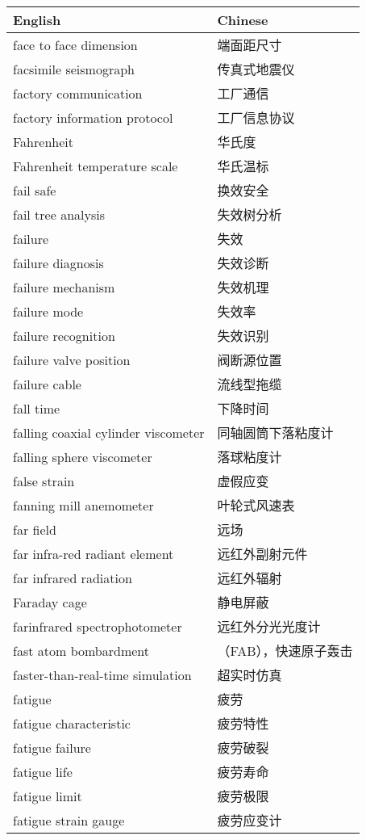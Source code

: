 \documentclass[
]{article}
\begin{document}
\begin{longtable}[]{@{}ll@{}}
\toprule()
English & Chinese \\
\midrule()
\endhead
face to face dimension & 端面距尺寸 \\
facsimile seismograph & 传真式地震仪 \\
factory communication & 工厂通信 \\
factory information protocol & 工厂信息协议 \\
Fahrenheit & 华氏度 \\
Fahrenheit temperature scale & 华氏温标 \\
fail safe & 换效安全 \\
fail tree analysis & 失效树分析 \\
failure & 失效 \\
failure diagnosis & 失效诊断 \\
failure mechanism & 失效机理 \\
failure mode & 失效率 \\
failure recognition & 失效识别 \\
failure valve position & 阀断源位置 \\
failure cable & 流线型拖缆 \\
fall time & 下降时间 \\
falling coaxial cylinder viscometer & 同轴圆筒下落粘度计 \\
falling sphere viscometer & 落球粘度计 \\
false strain & 虚假应变 \\
fanning mill anemometer & 叶轮式风速表 \\
far field & 远场 \\
far infra-red radiant element & 远红外副射元件 \\
far infrared radiation & 远红外辐射 \\
Faraday cage & 静电屏蔽 \\
farinfrared spectrophotometer & 远红外分光光度计 \\
fast atom bombardment & （FAB），快速原子轰击 \\
faster-than-real-time simulation & 超实时仿真 \\
fatigue & 疲劳 \\
fatigue characteristic & 疲劳特性 \\
fatigue failure & 疲劳破裂 \\
fatigue life & 疲劳寿命 \\
fatigue limit & 疲劳极限 \\
fatigue strain gauge & 疲劳应变计 \\

\end{longtable}
\end{document}
